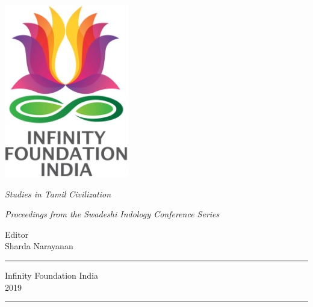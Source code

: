 \thispagestyle{empty}
\begin{center}
\includegraphics[scale=0.3]{images/logo.png}
\bigskip

{\fontsize{10}{14}\selectfont\sl
Studies in Tamil Civilization
}

\bigskip
\end{center}
\medskip

\begin{center}
{\fontsize{20}{24}\selectfont {F\,O\,U\,N\,T\; o\,f\; C\,U\,L\,T\,U\,R\,E}}
\bigskip

{\sl\small Proceedings from the Swadeshi Indology Conference Series}
\vfill


{\fontsize{14}{18}\selectfont 
Editor\\[2pt]
Sharda Narayanan\par
}
\vfill

\rule{5cm}{1pt}

{\fontsize{12}{14}\selectfont
Infinity Foundation India\\[4pt]
2019}

\rule{5cm}{1pt}
\end{center}




